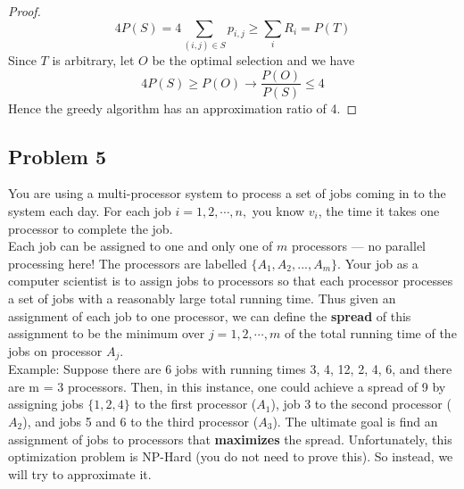 \documentclass[11pt]{article}
\begin{document}
\begin{enumerate}
\begin{proof}
        \[
            4P(S) = 4\sum_{(i,j)\in S} p_{i,j} \geq \sum_{i} R_i = P(T)
        \]
        Since $T$ is arbitrary, let $O$ be the optimal selection and we have 
        \[
            4P(S) \geq P(O) \to \frac{P(O)}{P(S)} \leq 4
        \]
        Hence the greedy algorithm has an approximation ratio of 4.
    \end{proof}
\end{enumerate}


\subsection*{Problem 5}


You are using a multi-processor system to process a set of jobs coming in to the system each day. For each job $i = 1,2,\cdots ,n,$ you know $v_i$, the time it takes one processor to complete the job. \\ 
Each job can be assigned to one and only one of $m$ processors — no parallel processing here! The processors are labelled $\{A_1,A_2,...,A_m\}$. Your job as a computer scientist is to assign jobs to processors so that each processor processes a set of jobs with a reasonably large total running time. Thus given an assignment of each job to one processor, we can define the \textbf{spread} of this assignment to be the minimum over $j = 1,2,\cdots ,m$ of the total running time of the jobs on processor $A_j$.\\
Example: Suppose there are 6 jobs with running times 3, 4, 12, 2, 4, 6, and there are m = 3 processors. Then, in this instance, one could achieve a spread of 9 by assigning jobs $\{1, 2, 4\}$ to the first processor ($A_1$), job 3 to the second processor ($A_2$), and jobs 5 and 6 to the third processor ($A_3$).
The ultimate goal is find an assignment of jobs to processors that \textbf{maximizes} the spread. Unfortunately, this optimization problem is NP-Hard (you do not need to prove this). So instead, we will try to approximate it.
\end{document}
